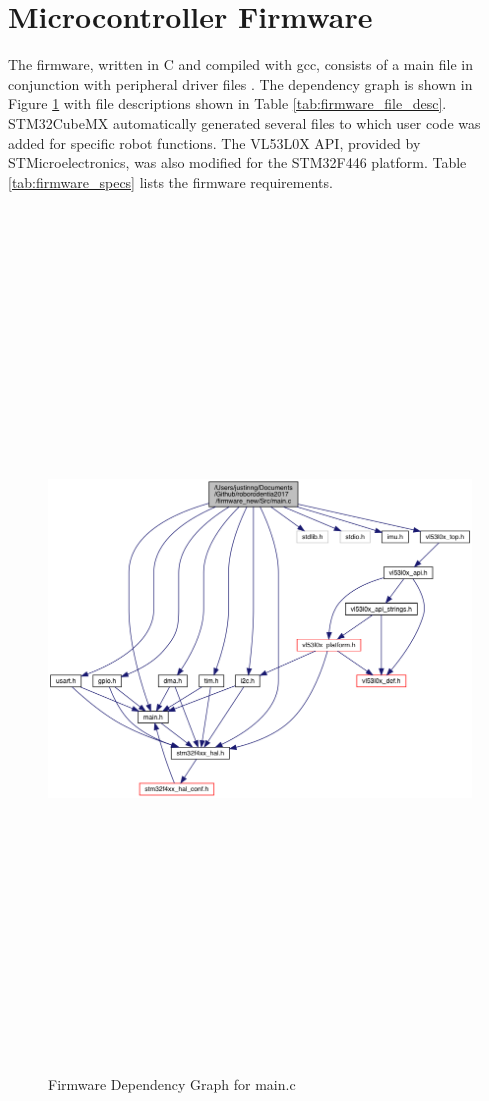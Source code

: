 \section{Microcontroller Firmware}
The firmware, written in C and compiled with gcc, consists of a main file in conjunction with peripheral driver files \cite{gcc}. The dependency graph is shown in Figure \ref{fig:firmware_dependencies} with file descriptions shown in Table \ref{tab:firmware_file_desc}.  STM32CubeMX automatically generated several files to which user code was added for specific robot functions. The VL53L0X API, provided by STMicroelectronics, was also modified for the STM32F446 platform. Table \ref{tab:firmware_specs} lists the firmware requirements.
\begin{figure}[H]   %
	\centering \includegraphics[width=6in,height=9in,keepaspectratio]{figures/firmware_dependencies.png}
	\caption{Firmware Dependency Graph for main.c}\label{fig:firmware_dependencies}
\end{figure}

